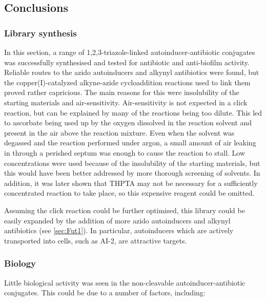 \subsection{Conclusions}

\subsubsection{Library synthesis}

In this section, a range of 1,2,3-triazole-linked autoinducer-antibiotic conjugates was successfully synthesised and tested for antibiotic and anti-biofilm activity.
Reliable routes to the azido autoinducers and alkynyl antibiotics were found, but the copper(I)-catalyzed alkyne-azide cycloaddition reactions used to link them proved rather capricious.
The main reasons for this were insolubility of the starting materials and air-sensitivity. 
Air-sensitivity is not expected in a click reaction, but can be explained by many of the reactions being too dilute\cite{Hong2009}. 
This led to ascorbate being used up by the oxygen dissolved in the reaction solvent and present in the air above the reaction mixture. 
Even when the solvent was degassed and the reaction performed under argon, a small amount of air leaking in through a perished septum was enough to cause the reaction to stall.
Low concentrations were used because of the insolubility of the starting materials, but this would have been better addressed by more thorough screening of solvents.
In addition, it was later shown that THPTA may not be necessary for a sufficiently concentrated reaction to take place\cite{Stokes2017}, so this expensive reagent could be omitted.

Assuming the click reaction could be further optimised, this library could be easily expanded by the addition of more azido autoinducers and alkynyl antibiotics (see \ref{sec:Fut1}). In particular, autoinducers which are actively transported into cells, such as AI-2, are attractive targets.

\subsubsection{Biology}

Little biological activity was seen in the non-cleavable autoinducer-antibiotic conjugates. This could be due to a number of factors, including:

